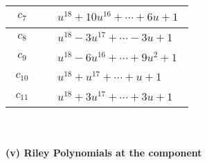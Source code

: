 \documentclass[1p]{elsarticle_modified}
\theoremstyle{definition}
\begin{document}
\begin{tabular}{m{50pt}|m{274pt}}
\hline $$\begin{aligned}c_{7}\end{aligned}$$&$\begin{aligned}
&u^{18}+10 u^{16}+\cdots+6 u+1
\end{aligned}$\\
\hline $$\begin{aligned}c_{8}\end{aligned}$$&$\begin{aligned}
&u^{18}-3 u^{17}+\cdots-3 u+1
\end{aligned}$\\
\hline $$\begin{aligned}c_{9}\end{aligned}$$&$\begin{aligned}
&u^{18}-6 u^{16}+\cdots+9 u^2+1
\end{aligned}$\\
\hline $$\begin{aligned}c_{10}\end{aligned}$$&$\begin{aligned}
&u^{18}+u^{17}+\cdots+u+1
\end{aligned}$\\
\hline $$\begin{aligned}c_{11}\end{aligned}$$&$\begin{aligned}
&u^{18}+3 u^{17}+\cdots+3 u+1
\end{aligned}$\\
\hline
\end{tabular}\\~\\
\newpage\renewcommand{\arraystretch}{1}
\flushleft \textbf{(v) Riley Polynomials at the component}\newline \\
\end{document}
